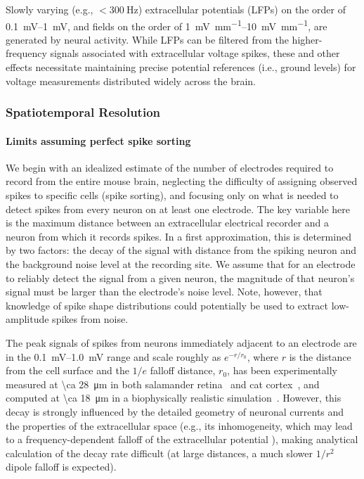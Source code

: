 Slowly varying (e.g., $< \SI{300}{\hertz}$) extracellular potentials (LFPs) \cite{reimann2013biophysically, buzsaki2012origin} on the order of \SIrange{0.1}{1}{\milli\volt}, and fields \cite{anastassiou2010effect} on the order of \SIrange{1}{10}{\milli\volt\per\milli\meter}, are generated by neural activity. While LFPs can be filtered from the higher-frequency signals associated with extracellular voltage spikes, these and other effects necessitate maintaining precise potential references (i.e., ground levels) for voltage measurements distributed widely across the brain.

\subsubsection{Spatiotemporal Resolution}

\paragraph{Limits assuming perfect spike sorting}
We begin with an idealized estimate of the number of electrodes required to record from the entire mouse brain, neglecting the difficulty of assigning observed spikes to specific cells (spike sorting), and focusing only on what is needed to detect spikes from every neuron on at least one electrode. The key variable here is the 
maximum distance between an extracellular electrical recorder and a neuron from which it records spikes.
In a first approximation, this is determined by two factors: the decay of the signal with distance from the spiking neuron and the background noise level at the recording site.
We assume that for an electrode to reliably detect the signal from a given neuron, the magnitude of that neuron's signal must be larger than the electrode's noise level. Note, however, that knowledge of spike shape distributions could potentially be used to extract low-amplitude spikes from noise.

The peak signals of spikes from neurons immediately adjacent to an electrode are in the \SIrange{0.1}{1.0}{\milli\volt} range and scale roughly as $e^{-r/r_0}$, where $r$ is the distance from the cell surface and the $1/e$ falloff distance, $r_0$, has been experimentally measured at \SI{\ca 28}{\micro\meter} in both salamander retina~\cite{segev04} and cat cortex~\cite{gray95}, and computed at \SI{\ca 18}{\micro\meter} in a biophysically realistic simulation~\cite{gold07, anastassiou20132}.
However, this decay is strongly influenced by the detailed geometry of neuronal currents and the properties of the extracellular space (e.g., its inhomogeneity, which may lead to a frequency-dependent falloff of the extracellular potential \cite{bedard2004modeling}), making analytical calculation of the decay rate difficult (at large distances, a much slower $1/r^2$ dipole falloff is expected).

